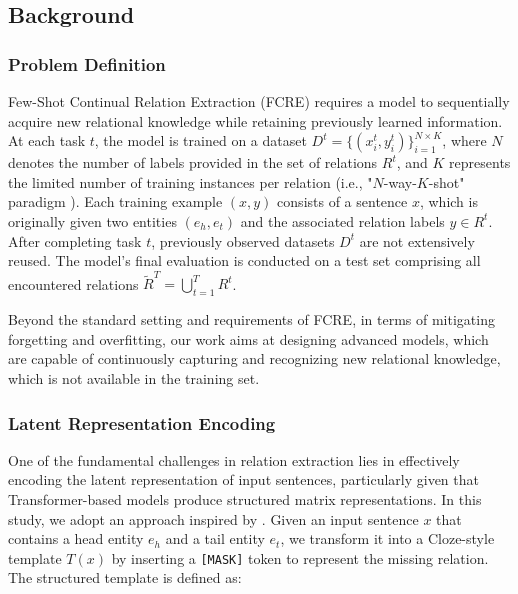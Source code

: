 


\subsection{Background}
\subsubsection{Problem Definition}
Few-Shot Continual Relation Extraction (FCRE) requires a model to sequentially acquire new relational knowledge while retaining previously learned information. At each task $t$, the model is trained on a dataset $D^t = \{(x_i^t, y_i^t)\}_{i=1}^{N \times K}$, where $N$ denotes the number of labels provided in the set of relations $R^t$, and $K$ represents the limited number of training instances per relation (i.e., "$N$-way-$K$-shot" paradigm \citet{chen-etal-2023-consistent}). Each training example $(x, y)$ consists of a sentence $x$, which is originally given two entities $(e_h, e_t)$ and the associated relation labels $y \in R^t$. After completing task $t$, previously observed datasets $D^t$ are not extensively reused. The model's final evaluation is conducted on a test set comprising all encountered relations $\tilde{R}^T = \bigcup_{t=1}^{T} R^t$.

Beyond the standard setting and requirements of FCRE, in terms of mitigating forgetting and overfitting, our work aims at designing advanced models, which are capable of continuously capturing and recognizing new relational knowledge, which is not available in the training set.

\subsubsection{Latent Representation Encoding}
One of the fundamental challenges in relation extraction lies in effectively {encoding the latent representation} of input sentences, particularly given that Transformer-based models \citep{vaswani2017attention} produce structured matrix representations. In this study, we adopt an approach inspired by \citet{ma-etal-2024-making}. Given an input sentence $x$ that contains a head entity $e_h$ and a tail entity $e_t$, we transform it into a Cloze-style template $T(x)$ by inserting a \texttt{[MASK]} token to represent the missing relation. The structured template is defined as:

